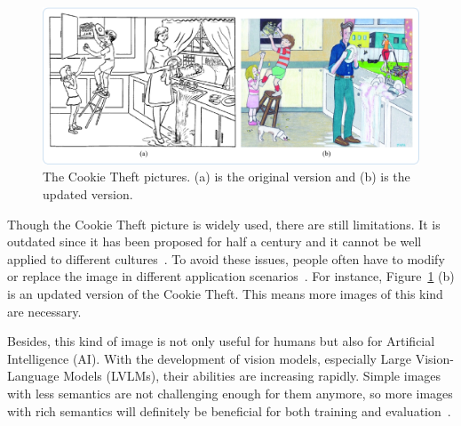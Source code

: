 \begin{figure}[htbp]
    \centering
    \includegraphics[scale=0.36]{figs/cookie_theft3.pdf}
    \caption{The Cookie Theft pictures. (a) is the original version and (b) is the updated version.}
    \label{ct}
\end{figure}



Though the Cookie Theft picture is widely used, there are still limitations. 
It is outdated since it has been proposed for half a century and it cannot be well applied to different cultures~\cite{berube2019stealing, rethinkingct}.
To avoid these issues, people often have to modify or replace the image in different application scenarios~\cite{berube2019stealing, HUSSEIN2015152, DOMINGUEZ2006476, Oh2012ValidityAR, Prasad2012ValidationOT}.
For instance, Figure~\ref{ct} (b) is an updated version of the Cookie Theft.
This means more images of this kind are necessary. 

Besides, this kind of image is not only useful for humans but also for Artificial Intelligence (AI).
With the development of vision models, especially Large Vision-Language Models (LVLMs), their abilities are increasing rapidly. 
Simple images with less semantics are not challenging enough for them anymore, so more images with rich semantics will definitely be beneficial for both training and evaluation~\cite{song2024cognitive}.

